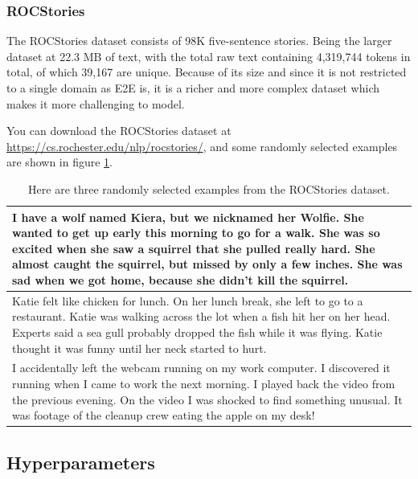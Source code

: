 \subsubsection{ROCStories}

The ROCStories dataset consists of 98K five-sentence stories. Being the larger dataset at 22.3 MB of text, with the total raw text containing 4,319,744 tokens in total, of which 39,167 are unique. Because of its size and since it is not restricted to a single domain as E2E is, it is a richer and more complex dataset which makes it more challenging to model.

You can download the ROCStories dataset at \href{https://cs.rochester.edu/nlp/rocstories/}{https://cs.rochester.edu/nlp/rocstories/}, and some randomly selected examples are shown in figure \ref{fig:roc-stories-examples}.

\begin{table}
  \centering
  \begin{tabular}{ | m{12cm}| } 
    \hline
    I have a wolf named Kiera, but we nicknamed her Wolfie. She wanted to get up early this morning to go for a walk. She was so excited when she saw a squirrel that she pulled really hard. She almost caught the squirrel, but missed by only a few inches. She was sad when we got home, because she didn't kill the squirrel. \\ \hline
    Katie felt like chicken for lunch. On her lunch break, she left to go to a restaurant. Katie was walking across the lot when a fish hit her on her head. Experts said a sea gull probably dropped the fish while it was flying. Katie thought it was funny until her neck started to hurt. \\ \hline
    I accidentally left the webcam running on my work computer. I discovered it running when I came to work the next morning. I played back the video from the previous evening. On the video I was shocked to find something unusual. It was footage of the cleanup crew eating the apple on my desk! \\
    \hline
  \end{tabular}
  \caption{Here are three randomly selected examples from the ROCStories dataset.}
  \label{fig:roc-stories-examples}
\end{table}

\subsection{Hyperparameters}

